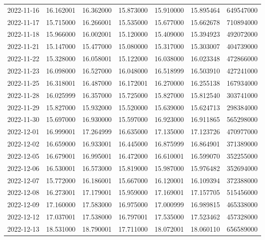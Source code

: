 \begin{tabular}{lrrrrrr}
2022-11-16 &   16.162001 &   16.362000 &   15.873000 &   15.910000 &   15.895464 &   649547000 \\
2022-11-17 &   15.715000 &   16.266001 &   15.535000 &   15.677000 &   15.662678 &   710894000 \\
2022-11-18 &   15.966000 &   16.002001 &   15.120000 &   15.409000 &   15.394923 &   492072000 \\
2022-11-21 &   15.147000 &   15.477000 &   15.080000 &   15.317000 &   15.303007 &   404739000 \\
2022-11-22 &   15.328000 &   16.058001 &   15.122000 &   16.038000 &   16.023348 &   472866000 \\
2022-11-23 &   16.098000 &   16.527000 &   16.048000 &   16.518999 &   16.503910 &   427241000 \\
2022-11-25 &   16.318001 &   16.487000 &   16.172001 &   16.270000 &   16.255138 &   167934000 \\
2022-11-28 &   16.025999 &   16.357000 &   15.725000 &   15.827000 &   15.812540 &   303741000 \\
2022-11-29 &   15.827000 &   15.932000 &   15.520000 &   15.639000 &   15.624713 &   298384000 \\
2022-11-30 &   15.697000 &   16.930000 &   15.597000 &   16.923000 &   16.911865 &   565298000 \\
2022-12-01 &   16.999001 &   17.264999 &   16.635000 &   17.135000 &   17.123726 &   470977000 \\
2022-12-02 &   16.659000 &   16.933001 &   16.445000 &   16.875999 &   16.864901 &   371389000 \\
2022-12-05 &   16.679001 &   16.995001 &   16.472000 &   16.610001 &   16.599070 &   352255000 \\
2022-12-06 &   16.530001 &   16.573000 &   15.819000 &   15.987000 &   15.976482 &   352694000 \\
2022-12-07 &   15.772000 &   16.186001 &   15.667000 &   16.120001 &   16.109394 &   372388000 \\
2022-12-08 &   16.273001 &   17.179001 &   15.959000 &   17.169001 &   17.157705 &   515456000 \\
2022-12-09 &   17.160000 &   17.583000 &   16.975000 &   17.000999 &   16.989815 &   465338000 \\
2022-12-12 &   17.037001 &   17.538000 &   16.797001 &   17.535000 &   17.523462 &   457328000 \\
2022-12-13 &   18.531000 &   18.790001 &   17.711000 &   18.072001 &   18.060110 &   656589000 \\

\end{tabular}
